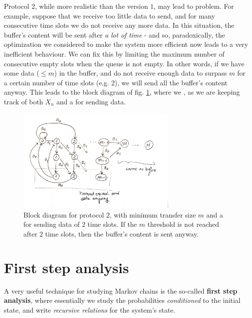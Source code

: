 \documentclass[../template.tex]{subfiles}
\begin{document}
Protocol 2, while more realistic than the version $1$, may lead to problem. For example, suppose that we receive too little data to send, and for many consecutive time slots we do not receive any more data. In this situation, the buffer's content will be sent after \textit{a lot of time} - and so, paradoxically, the optimization we considered to make the system more efficient now leads to a very inefficient behaviour. We can fix this by limiting the maximum number of consecutive empty slots when the queue is not empty. In other words, if we have some data ($\leq m$) in the buffer, and do not receive enough data to surpass $m$ for a certain number of time slots (e.g. $2$), we will send all the buffer's content anyway. This leads to the block diagram of fig. \ref{fig:block4}, where we , as we are keeping track of both $X_n$ and a  for sending data.

\begin{figure}[htp]
    \centering
    \includegraphics[width=0.7\textwidth]{block4.jpeg}
    \caption{Block diagram for protocol $2$, with minimum transfer size $m$ and a  for sending data of $2$ time slots. If the $m$ threshold is not reached after $2$ time slots, then the buffer's content is sent anyway.\label{fig:block4}} 
\end{figure}

\section{First step analysis}
A very useful technique for studying Markov chains is the so-called \textbf{first step analysis}, where essentially we study the probabilities \textit{conditioned} to the initial state, and write \textit{recursive relations} for the system's state.

\medskip
\end{document}

